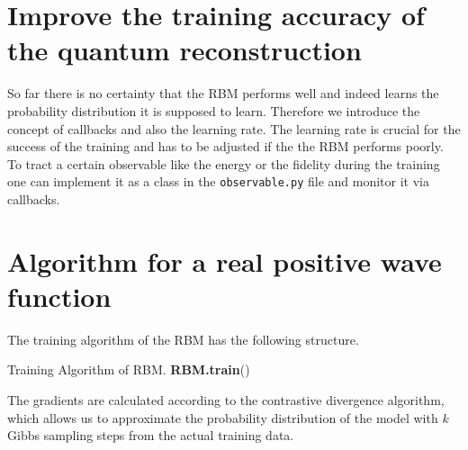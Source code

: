 \documentclass[submission, Phys]{SciPost}
\begin{document}
\section{Improve the training accuracy of the quantum reconstruction}

So far there is no certainty that the RBM performs well and indeed learns the probability distribution it is supposed to learn. Therefore we introduce the concept of callbacks and also the learning rate. The learning rate is crucial for the success of the training and has to be adjusted if the the RBM performs poorly.
To tract a certain observable like the energy or the fidelity during the training one can implement it as a class in the \verb|observable.py| file and monitor it via callbacks.

\section{Algorithm for a real positive wave function}
The training algorithm of the RBM has the following structure.
 
\begin{algorithm}[H]
	 \caption{Training Algorithm of RBM. \textbf{RBM.train}() }
  \SetAlgoLined
 
\end{algorithm}


The gradients are calculated according to the contrastive divergence algorithm, which allows us to approximate the probability distribution of the model with $k$ Gibbs sampling steps from the actual training data.
\end{document}
